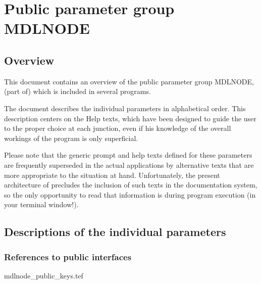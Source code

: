 
\chapter{ Public parameter group MDLNODE}
\tableofcontents


\section{ Overview}

	This document contains an overview of the public parameter group
MDLNODE, (part of) which is included in several \NEWSTAR programs.



	The
document describes the individual parameters in alphabetical order. This
description centers on the Help texts, which have been designed to guide the
user to the proper choice at each junction, even if his knowledge of the
overall workings of the program is only superficial.

	Please note that the generic prompt and help texts defined for these
parameters are frequently superseded in the actual applications by alternative
texts that are more appropriate to the situation at hand. Unfortunately, the
present architecture of \NEWSTAR precludes the inclusion of such texts in the
documentation system, so the only opportunity to read that information is
during program execution (in your terminal window!).


\section{ Descriptions of the individual parameters}
\label{.descriptions}

\subsection{ References to public interfaces}
\label{.public}

 {mdlnode_public_keys.tef}
